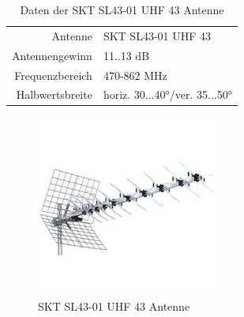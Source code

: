 \begin{table}
    \centering
    \begin{tabular}[h]{rl}
        Antenne         & SKT SL43-01 UHF 43            \\
        Antennengewinn  & 11..13 dB                     \\
        Frequenzbereich & 470-862 MHz                   \\
        Halbwertsbreite & horiz. 30...40°/ver. 35...50° \\
    \end{tabular}
    \caption{Daten der SKT SL43-01 UHF 43 Antenne}\label{table:antenne}
\end{table}

\begin{figure}
    \centering
    \includegraphics[width=\textwidth]{images/antenne.png}
    \caption{SKT SL43-01 UHF 43 Antenne}\label{fig:antenne}
\end{figure}


